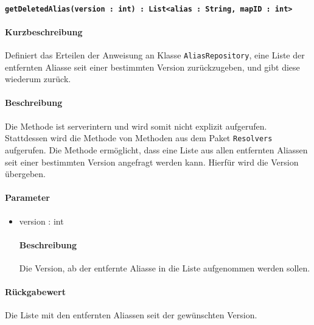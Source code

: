 \paragraph*{\texttt{getDeletedAlias(version : int) : List<alias : String, mapID : int>}}%
\paragraph*{Kurzbeschreibung}
Definiert das Erteilen der Anweisung an Klasse \texttt{AliasRepository}, eine Liste der entfernten Aliasse seit einer bestimmten Version zurückzugeben, und gibt diese wiederum zurück.
\paragraph*{Beschreibung}
Die Methode ist serverintern und wird somit nicht explizit aufgerufen.
Stattdessen wird die Methode von Methoden aus dem Paket \texttt{Resolvers} aufgerufen.
Die Methode ermöglicht, dass eine Liste aus allen entfernten Aliassen seit einer bestimmten Version angefragt werden kann.
Hierfür wird die Version übergeben.
\paragraph*{Parameter}
\begin{itemize}
    \item version : int
    		\paragraph*{Beschreibung}
    		Die Version, ab der entfernte Aliasse in die Liste aufgenommen werden sollen.
\end{itemize}
\paragraph*{Rückgabewert}
Die Liste mit den entfernten Aliassen seit der gewünschten Version.
